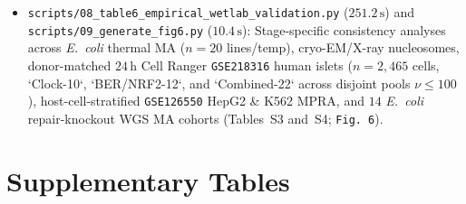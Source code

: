 \documentclass[10pt,letterpaper]{article}
\begin{document}
\begin{itemize}
    \item \texttt{scripts/08\_\allowbreak table6\_\allowbreak empirical\_\allowbreak wetlab\_\allowbreak validation.py} ($251.2\,\mathrm{s}$) and \texttt{scripts/09\_\allowbreak generate\_\allowbreak fig6.py} ($10.4\,\mathrm{s}$): Stage-specific consistency analyses across \emph{E.\ coli} thermal MA ($n=20$ lines/temp), cryo-EM/X-ray nucleosomes, donor-matched $24\,\mathrm{h}$ Cell Ranger \texttt{GSE218316} human islets ($n = 2{,}465$ cells, `Clock-10`, `BER/NRF2-12`, and `Combined-22` across disjoint pools $\nu \le 100$), host-cell-stratified \texttt{GSE126550} HepG2 \& K562 MPRA, and $14$ \emph{E.\ coli} repair-knockout WGS MA cohorts (Tables~S3 and~S4; \texttt{Fig.~6}).
\end{itemize}

\clearpage
\section*{Supplementary Tables}
\end{document}
